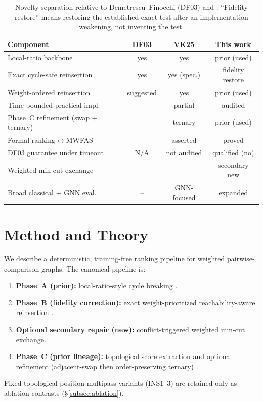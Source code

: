 \documentclass{article}
\begin{document}
\begin{table}[t]
\centering
\small
\setlength{\tabcolsep}{3.5pt}
\begin{tabular}{@{}lccc@{}}
\toprule
\textbf{Component} & \textbf{DF03} & \textbf{VK25} & \textbf{This work} \\
\midrule
Local-ratio backbone & yes & yes & prior (used) \\
Exact cycle-safe reinsertion & yes & yes (spec.) & fidelity restore \\
Weight-ordered reinsertion & suggested & yes & prior (used) \\
Time-bounded practical impl.\ & -- & partial & audited \\
Phase~C refinement (swap + ternary) & -- & ternary & prior (used) \\
Formal ranking$\leftrightarrow$MWFAS & -- & asserted & proved \\
DF03 guarantee under timeout & N/A & not audited & qualified (no) \\
Weighted min-cut exchange & -- & -- & secondary new \\
Broad classical + GNN eval.\ & -- & GNN-focused & expanded \\
\bottomrule
\end{tabular}
\caption{Novelty separation relative to Demetrescu--Finocchi (DF03) and \citet{VK25}. ``Fidelity restore'' means restoring the established exact test after an implementation weakening, not inventing the test.}
\label{tab:novelty_separation}
\end{table}

\section{Method and Theory}
\label{sec:framework}

We describe a deterministic, training-free ranking pipeline for weighted pairwise-comparison graphs. The canonical pipeline is:
\begin{enumerate}
\item \textbf{Phase~A (prior):} local-ratio-style cycle breaking \citet{CI03,VK25}.
\item \textbf{Phase~B (fidelity correction):} exact weight-prioritized reachability-aware reinsertion \citet{CI03,VK25}.
\item \textbf{Optional secondary repair (new):} conflict-triggered weighted min-cut exchange.
\item \textbf{Phase~C (prior lineage):} topological score extraction and optional refinement (adjacent-swap then order-preserving ternary) \citet{VK25}.
\end{enumerate}
Fixed-topological-position multipass variants (INS1--3) are retained only as ablation contrasts (\S\ref{subsec:ablation}).
\end{document}

